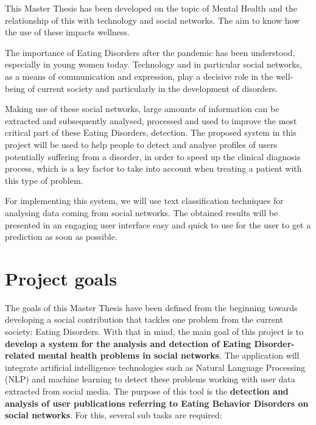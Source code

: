 

This Master Thesis has been developed on the topic of Mental Health and the relationship of this with technology and social networks. The aim to know how the use of these impacts wellness. 


The importance of Eating Disorders after the pandemic has been understood, especially in young women today. Technology and in particular social networks, as a means of communication and expression, play a decisive role in the well-being of current society and particularly in the development of disorders.

Making use of these social networks, large amounts of information can be extracted and subsequently analysed, processed and used to improve the most critical part of these Eating Disorders, detection. The proposed system in this project will be used to help people to detect and analyse profiles of users potentially suffering from a disorder, in order to speed up the clinical diagnosis process, which is a key factor to take into account when treating a patient with this type of problem.

For implementing this system, we will use text classification techniques for analysing data coming from social networks. The obtained results will be presented in an engaging user interface easy and quick to use for the user to get a prediction as soon as possible.


\section{Project goals}
\label{sec:goals}
The goals of this Master Thesis have been defined from the beginning towards developing a social contribution that tackles one problem from the current society: Eating Disorders. With that in mind, the main goal of this project is to \textbf{develop a system for the analysis and detection of Eating Disorder-related mental health problems in social networks}. The application will integrate artificial intelligence technologies such as Natural Language Processing (NLP) and machine learning to detect these problems working with user data extracted from social media. The purpose of this tool is the \textbf{detection and analysis of user publications referring to Eating Behavior Disorders on social networks}. For this, several sub tasks are required:

